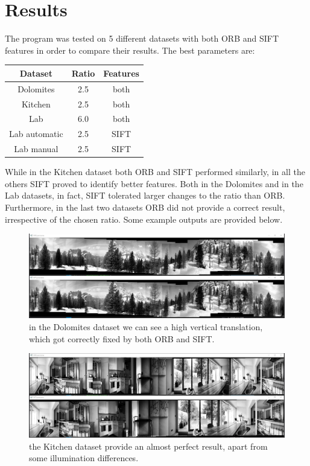 \documentclass{article}
\begin{document}
\section{Results}
The program was tested on 5 different datasets with both ORB and SIFT features in order to compare their results.
The best parameters are:\\

\begin{center}
\begin{tabular}{ |c|c|c| }
\hline
Dataset & Ratio & Features \\
\hline
\hline
Dolomites & 2.5 & both \\
\hline
Kitchen & 2.5 & both \\
\hline
Lab & 6.0 & both \\
\hline
Lab automatic & 2.5 & SIFT \\
\hline
Lab manual & 2.5 & SIFT \\
\hline
\end{tabular}
\end{center}

While in the Kitchen dataset both ORB and SIFT performed similarly, in all the others SIFT proved to identify better features.
Both in the Dolomites and in the Lab datasets, in fact, SIFT tolerated larger changes to the ratio than ORB. Furthermore, in the last two datasets ORB did not provide a correct result, irrespective of the chosen ratio.
Some example outputs are provided below.

\begin{figure}[h]
\begin{center}
\includegraphics[width=1\textwidth]{images/dolomites}
\caption{\footnotesize{in the Dolomites dataset we can see a high vertical translation, which got correctly fixed by both ORB and SIFT.}}
\label{img_dolomites}
\end{center}
\end{figure}

\begin{figure}[h]
\begin{center}
\includegraphics[width=1\textwidth]{images/kitchen}
\caption{\footnotesize{the Kitchen dataset provide an almost perfect result, apart from some illumination differences.}}
\label{img_kitchen}
\end{center}
\end{figure}
\end{document}
